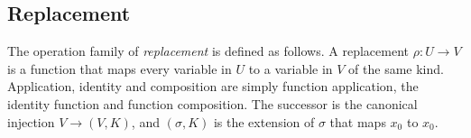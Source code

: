 
\subsection{Replacement}

The operation family of \emph{replacement} is defined as follows.  A replacement $\rho : U \rightarrow V$ is a function
that maps every variable in $U$ to a variable in $V$ of the same kind.  Application, identity and composition are simply
function application, the identity function and function composition.  The successor is the canonical injection $V \rightarrow (V, K)$,
and $(\sigma , K)$ is the extension of $\sigma$ that maps $x_0$ to $x_0$.

